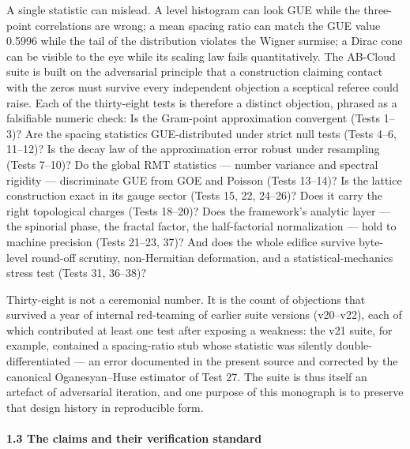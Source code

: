 \documentclass[10pt]{article}
\begin{document}
A single statistic can mislead. A level histogram can look GUE while the three-point correlations are wrong; a mean spacing ratio can match the GUE value 0.5996 while the tail of the distribution violates the Wigner surmise; a Dirac cone can be visible to the eye while its scaling law fails quantitatively. The AB-Cloud suite is built on the adversarial principle that a construction claiming contact with the zeros must survive every independent objection a sceptical referee could raise. Each of the thirty-eight tests is therefore a distinct objection, phrased as a falsifiable numeric check: Is the Gram-point approximation convergent (Tests 1--3)? Are the spacing statistics GUE-distributed under strict null tests (Tests 4--6, 11--12)? Is the decay law of the approximation error robust under resampling (Tests 7--10)? Do the global RMT statistics --- number variance and spectral rigidity --- discriminate GUE from GOE and Poisson (Tests 13--14)? Is the lattice construction exact in its gauge sector (Tests 15, 22, 24--26)? Does it carry the right topological charges (Tests 18--20)? Does the framework's analytic layer --- the spinorial phase, the fractal factor, the half-factorial normalization --- hold to machine precision (Tests 21--23, 37)? And does the whole edifice survive byte-level round-off scrutiny, non-Hermitian deformation, and a statistical-mechanics stress test (Tests 31, 36--38)?

Thirty-eight is not a ceremonial number. It is the count of objections that survived a year of internal red-teaming of earlier suite versions (v20--v22), each of which contributed at least one test after exposing a weakness: the v21 suite, for example, contained a spacing-ratio stub whose statistic was silently double-differentiated --- an error documented in the present source and corrected by the canonical Oganesyan--Huse estimator of Test 27. The suite is thus itself an artefact of adversarial iteration, and one purpose of this monograph is to preserve that design history in reproducible form.

\paragraph{1.3 The claims and their verification standard}
\end{document}
